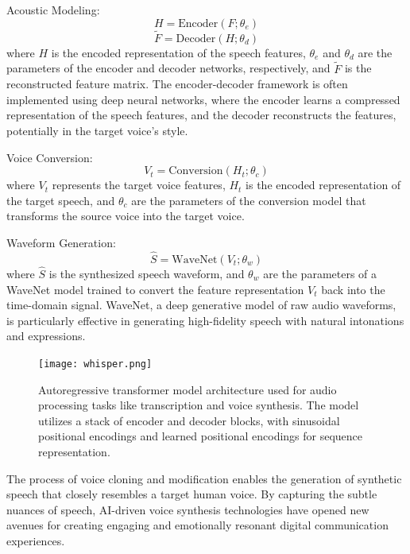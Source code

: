 \documentclass[11pt,a4paper,oneside]{report}
\begin{document}
Acoustic Modeling:
\begin{equation}
H = \text{Encoder}(F; \theta_e)
\end{equation}
\begin{equation}
\tilde{F} = \text{Decoder}(H; \theta_d)
\end{equation}
where $H$ is the encoded representation of the speech features, $\theta_e$ and $\theta_d$ are the parameters of the encoder and decoder networks, respectively, and $\tilde{F}$ is the reconstructed feature matrix. The encoder-decoder framework is often implemented using deep neural networks, where the encoder learns a compressed representation of the speech features, and the decoder reconstructs the features, potentially in the target voice's style.

Voice Conversion:
\begin{equation}
V_t = \text{Conversion}(H_t; \theta_c)
\end{equation}
where $V_t$ represents the target voice features, $H_t$ is the encoded representation of the target speech, and $\theta_c$ are the parameters of the conversion model that transforms the source voice into the target voice.

Waveform Generation:
\begin{equation}
\hat{S} = \text{WaveNet}(V_t; \theta_w)
\end{equation}
where $\hat{S}$ is the synthesized speech waveform, and $\theta_w$ are the parameters of a WaveNet \cite{oord2016wavenet} model trained to convert the feature representation $V_t$ back into the time-domain signal. WaveNet, a deep generative model of raw audio waveforms, is particularly effective in generating high-fidelity speech with natural intonations and expressions.

\begin{figure}[htbp]
  \centering
  \texttt{[image: whisper.png]}
  \caption{Autoregressive transformer model architecture used for audio processing tasks like transcription and voice synthesis. The model utilizes a stack of encoder and decoder blocks, with sinusoidal positional encodings and learned positional encodings for sequence representation. \cite{OpenAIWhisper}}
\end{figure}

The process of voice cloning and modification enables the generation of synthetic speech that closely resembles a target human voice. 
By capturing the subtle nuances of speech, AI-driven voice synthesis technologies have opened new avenues for creating engaging and emotionally resonant digital communication experiences. 
\end{document}
